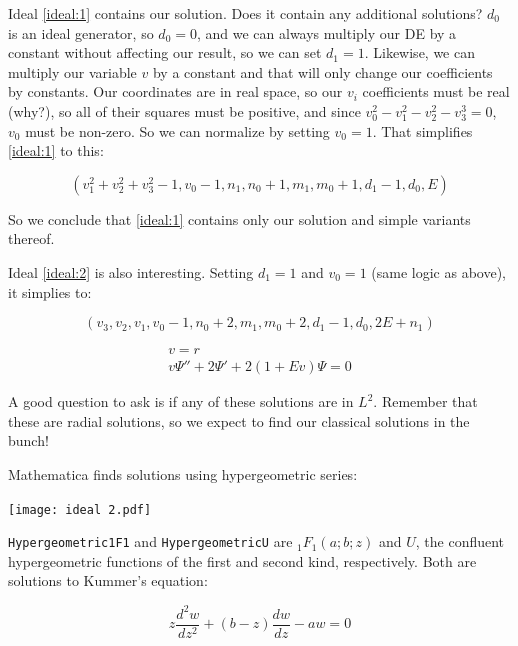 \documentclass{article}
\begin{document}
Ideal \eqref{ideal:1} contains our solution.  Does it contain any additional solutions?  $d_0$ is an ideal generator,
so $d_0=0$, and we can always multiply our DE by a constant without affecting our result, so we can set $d_1=1$.
Likewise, we can multiply our variable $v$ by a constant and that will only change our coefficients by constants.
Our coordinates are in real space, so our $v_i$ coefficients must be real (why?), so all of their squares must
be positive, and since $v_0^2-v_1^2-v_2^2-v_3^3=0$, $v_0$ must be non-zero.  So we can normalize by setting $v_0=1$.
That simplifies \eqref{ideal:1} to this:

\begin{equation}
\left(v_{1}^{2} + v_{2}^{2} + v_{3}^{2} - 1, v_{0} - 1, n_{1}, n_{0} + 1, m_{1}, m_{0} + 1, d_{1} - 1, d_{0}, E\right)
\end{equation}

So we conclude that \eqref{ideal:1} contains only our solution and simple variants thereof.

Ideal \eqref{ideal:2} is also interesting.  Setting $d_1=1$ and $v_0=1$ (same logic as above), it simplies to:

\begin{equation}
\left(v_{3}, v_{2}, v_{1}, v_{0} - 1, n_{0} + 2, m_{1}, m_{0} + 2, d_{1} - 1, d_{0}, 2 E + n_{1}\right)
\end{equation}

\begin{equation}
\begin{gathered}
v=r \\
v \Psi'' + 2 \Psi' + 2(1 + E v) \Psi = 0
\end{gathered}
\end{equation}

A good question to ask is if any of these solutions are in $L^2$.  Remember that these are radial solutions,
so we expect to find our classical solutions in the bunch!

Mathematica finds solutions using hypergeometric series:

\texttt{[image: ideal 2.pdf]}

{\tt Hypergeometric1F1} and {\tt HypergeometricU} are ${}_1F_1(a;b;z)$ and $U$,
the confluent hypergeometric functions of the first and second kind,
respectively.  Both are solutions to Kummer's equation:

\begin{equation}
z\frac{d^2w}{dz^2} + (b-z)\frac{dw}{dz} - aw = 0
\end{equation}
\end{document}
